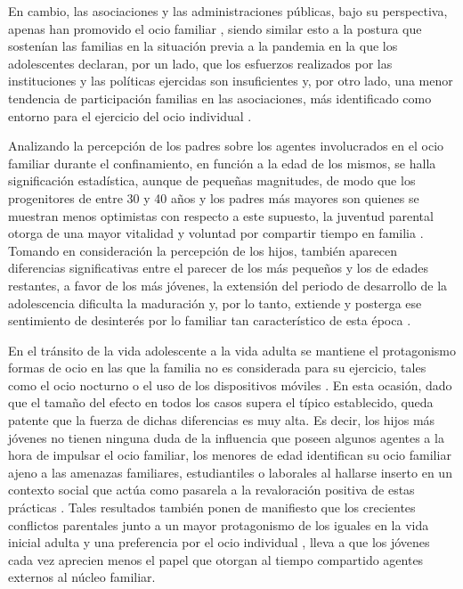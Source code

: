 \documentclass{textolivre}
\begin{document}
En cambio, las asociaciones y las administraciones públicas, bajo su perspectiva, apenas han promovido el ocio familiar , siendo similar esto a la postura que sostenían las familias en la situación previa a la pandemia en la que los adolescentes declaran, por un lado, que los esfuerzos realizados por las instituciones y las políticas ejercidas son insuficientes y, por otro lado, una menor tendencia de participación familias en las asociaciones, más identificado como entorno para el ejercicio del ocio individual \cite{alvarez2020}.

Analizando la percepción de los padres sobre los agentes involucrados en el ocio familiar durante el confinamiento, en función a la edad de los mismos, se halla significación estadística, aunque de pequeñas magnitudes, de modo que los progenitores de entre 30 y 40 años y los padres más mayores son quienes se muestran menos optimistas con respecto a este supuesto, la juventud parental otorga de una mayor vitalidad y voluntad por compartir tiempo en familia \cite{roeters2016}. Tomando en consideración la percepción de los hijos, también aparecen diferencias significativas entre el parecer de los más pequeños y los de edades restantes, a favor de los más jóvenes, la extensión del periodo de desarrollo de la adolescencia dificulta la maduración y, por lo tanto, extiende y posterga ese sentimiento de desinterés por lo familiar tan característico de esta época \cite{hernandez2017}. 

En el tránsito de la vida adolescente a la vida adulta se mantiene el protagonismo formas de ocio en las que la familia no es considerada para su ejercicio, tales como el ocio nocturno \cite{lavielle-sotomayor2014} o el uso de los dispositivos móviles \cite{alfarogonzales2015}. En esta ocasión, dado que el tamaño del efecto en todos los casos supera el típico establecido, queda patente que la fuerza de dichas diferencias es muy alta. Es decir, los hijos más jóvenes no tienen ninguna duda de la influencia que poseen algunos agentes a la hora de impulsar el ocio familiar, los menores de edad identifican su ocio familiar ajeno a las amenazas familiares, estudiantiles o laborales al hallarse inserto en un contexto social que actúa como pasarela a la revaloración positiva de estas prácticas \cite{sanzarazuri2018}. Tales resultados también ponen de manifiesto que los crecientes conflictos parentales \cite{cummings2008} junto a un mayor protagonismo de los iguales en la vida inicial adulta \cite{caneroperez2019} y una preferencia por el ocio individual \cite{urgilesleon2018}, lleva a que los jóvenes cada vez aprecien menos el papel que otorgan al tiempo compartido agentes externos al núcleo familiar. 
\end{document}
